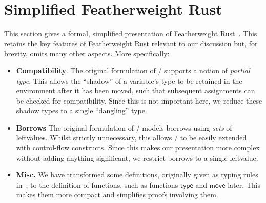 \section{Simplified Featherweight Rust}\label{sec:featherweight}

This section gives a formal, simplified presentation of Featherweight
Rust~\cite{Pea21}.  This retains the key features of Featherweight
Rust relevant to our discussion but, for brevity, omits many other
aspects.  More specifically:
%
\begin{itemize}

\item {\bf Compatibility}.  The original formulation of \FR/ supports
  a notion of {\em partial type}.  This allows the ``shadow'' of a
  variable's type to be retained in the environment after it has been
  moved, such that subsequent assignments can be checked for
  compatibility.  Since this is not important here, we reduce these
  shadow types to a single ``dangling'' type.
  
\item {\bf Borrows} The original formulation of \FR/ models borrows
  using {\em sets} of leftvalues.  Whilst strictly unnecessary, this
  allows \FR/ to be easily extended with control-flow constructs.
  Since this makes our presentation more complex without adding
  anything significant, we restrict borrows to a single leftvalue.

\item {\bf Misc.} We have transformed some definitions, originally
  given as typing rules in~\cite{Pea21}, to the definition of
  functions, such as functions $\mathsf{type}$ and $\mathsf{move}$
  later.  This makes them more compact and simplifies proofs involving
  them.
\end{itemize}

